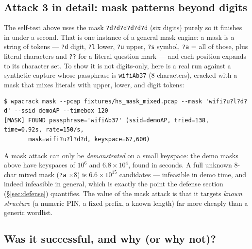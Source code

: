 \documentclass[11pt,a4paper]{article}
\newcommand{\code}[1]{\texttt{#1}}
\begin{document}
\subsection{Attack 3 in detail: mask patterns beyond digits}

The self-test above uses the mask \code{?d?d?d?d?d?d} (six digits) purely so it finishes in
under a second. That is one instance of a general mask engine: a mask is a string of tokens
--- \code{?d} digit, \code{?l} lower, \code{?u} upper, \code{?s} symbol, \code{?a} = all of
those, plus literal characters and \code{??} for a literal question mark --- and each position
expands to its character set. To show it is not digits-only, here is a real run against a
synthetic capture whose passphrase is \code{wifiAb37} (8 characters), cracked with a mask that
mixes literals with upper, lower, and digit tokens:

\begin{verbatim}
$ wpacrack mask --pcap fixtures/hs_mask_mixed.pcap --mask 'wifi?u?l?d?d' --ssid demoAP --timebox 120
[MASK] FOUND passphrase='wifiAb37' (ssid=demoAP, tried=138, time=0.92s, rate=150/s,
       mask=wifi?u?l?d?d, keyspace=67,600)
\end{verbatim}

\noindent A mask attack can only be \emph{demonstrated} on a small keyspace: the demo masks
above have keyspaces of $10^{6}$ and $6.8\times10^{4}$, found in seconds. A full unknown 8-char
mixed mask (\code{?a} $\times 8$) is $6.6\times10^{15}$ candidates --- infeasible in demo time,
and indeed infeasible in general, which is exactly the point the defense section
(\S\ref{sec:defense}) quantifies. The value of the mask attack is that it targets \emph{known
structure} (a numeric PIN, a fixed prefix, a known length) far more cheaply than a generic
wordlist.

\subsection{Was it successful, and why (or why not)?}
\end{document}
